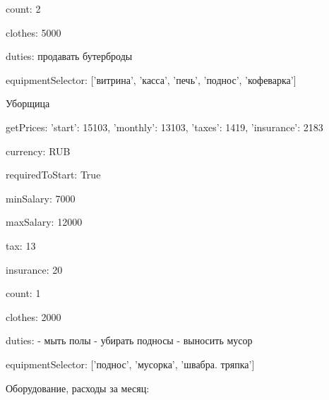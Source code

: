 \documentclass[a4paper,12pt]{article}
\begin{document}
        
        count: 2

        
        clothes: 5000

        
        duties: продавать бутерброды

        
        equipmentSelector: ['витрина', 'касса', 'печь', 'поднос', 'кофеварка']

        
      
      Уборщица
        
        getPrices: {'start': 15103, 'monthly': 13103, 'taxes': 1419, 'insurance': 2183}

        
        currency: RUB

        
        requiredToStart: True

        
        minSalary: 7000

        
        maxSalary: 12000

        
        tax: 13

        
        insurance: 20

        
        count: 1

        
        clothes: 2000

        
        duties: - мыть полы
- убирать подносы
- выносить мусор

        
        equipmentSelector: ['поднос', 'мусорка', 'швабра. тряпка']

        
      
    

    Оборудование, расходы за месяц:

  
\end{document}
